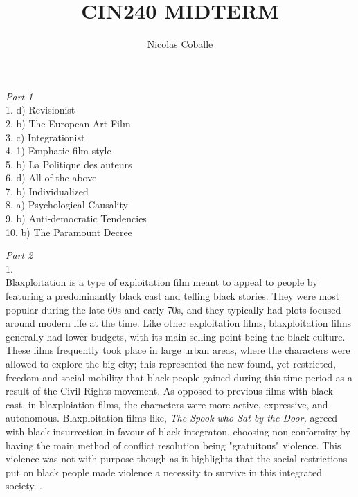 \documentclass[12pt]{article}
\title{CIN240 MIDTERM}
\author{Nicolas Coballe}
\begin{document}
\maketitle
\begin{flushleft}
\textit{Part 1} \\
1. d) Revisionist \\
2. b) The European Art Film\\
3. c) Integrationist \\
4. 1) Emphatic film style\\
5. b) La Politique des auteurs \\
6. d) All of the above \\
7. b) Individualized \\
8. a) Psychological Causality\\
9. b) Anti-democratic Tendencies\\
10. b) The Paramount Decree 
\newpage

\textit{Part 2} \\
1. \\
Blaxploitation is a type of exploitation film meant to appeal to people by featuring a predominantly black cast and telling black stories. They were most popular during the late 60s and early 70s, and they typically had plots focused around modern life at the time. Like other exploitation films, blaxploitation films generally had lower budgets, with its main selling point being the black culture. These films frequently took place in large urban areas, where the characters were allowed to explore the big city; this represented the new-found, yet restricted, freedom and social mobility that black people gained during this time period as a result of the Civil Rights movement. As opposed to previous films with black cast, in blaxploiation films, the characters were more active, expressive, and autonomous. Blaxploitation films like, \textit{The Spook who Sat by the Door,} agreed with black insurrection in favour of black integraton, choosing non-conformity by having the main method of conflict resolution being "gratuitous" violence. This violence was not with purpose though as it highlights that the social restrictions put on black people made violence a necessity to survive in this integrated society.
. \\



\end{flushleft}
\end{document}
